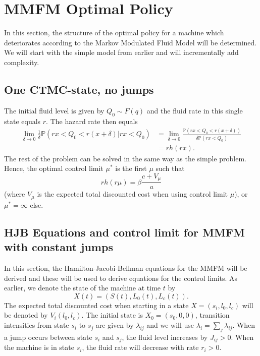 


\chapter{MMFM Optimal Policy}
In this section, the structure of the optimal policy for a machine which deteriorates according to the Markov Modulated Fluid Model will be determined.
We will start with the simple model from earlier and will incrementally add complexity.

\section{One CTMC-state, no jumps}
The initial fluid level is given by $Q_0\sim F(q)$ and the fluid rate in this single state equals $r$.
The hazard rate then equals
\begin{equation}
\begin{split}
\lim\limits_{\delta\rightarrow0}\frac{1}{\delta}\mathbb{P}(rx<Q_0<r(x+\delta)|rx<Q_0)&=\lim\limits_{\delta\rightarrow0}\frac{\mathbb{P}(rx<Q_0<r(x+\delta))}{\delta\mathbb{P}(rx<Q_0)}\\
&=rh(rx).
\end{split}
\end{equation}
The rest of the problem can be solved in the same way as the simple problem.
Hence, the optimal control limit $\mu^*$ is the first $\mu$ such that
\begin{equation}
rh(r\mu)=\beta\frac{c+V_\mu}{a}
\end{equation}
(where $V_\mu$ is the expected total discounted cost when using control limit $\mu$), or $\mu^*=\infty$ else.

\section{HJB Equations and control limit for MMFM with constant jumps}
In this section, the Hamilton-Jacobi-Bellman equations for the MMFM will be derived and these will be used to derive equations for the control limits.
As earlier, we denote the state of the machine at time $t$ by
$$
X(t)=(S(t),L_0(t),L_c(t)).
$$
The expected total discounted cost when starting in a state $X=(s_i,l_0,l_c)$ will be denoted by $V_i(l_0,l_c)$.
The initial state is $X_0=(s_0,0,0)$, transition intensities from state $s_i$ to $s_j$ are given by $\lambda_{ij}$ and we will use $\lambda_i=\sum\limits_j \lambda_{ij}$.
When a jump occurs between state $s_i$ and $s_j$, the fluid level increases by $J_{ij}>0$.
When the machine is in state $s_i$, the fluid rate will decrease with rate $r_i>0$.

